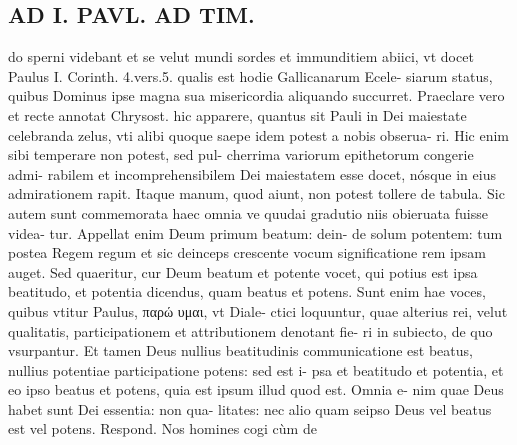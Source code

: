 \documentclass{article}
\begin{document}
\begin{pages}
\section*{AD I. PAVL. AD TIM. }
\marginpar{[ p.300 ]}\pstart do sperni videbant et se velut mundi sordes et immunditiem abiici, vt docet Paulus I. Corinth. 4.vers.5. qualis est hodie Gallicanarum Ecele- siarum status, quibus Dominus ipse magna sua misericordia aliquando succurret. Praeclare vero et recte annotat Chrysost. hic apparere, quantus sit Pauli in Dei maiestate celebranda zelus, vti alibi quoque saepe idem potest a nobis obserua- ri. Hic enim sibi temperare non potest, sed pul- cherrima variorum epithetorum congerie admi- rabilem et incomprehensibilem Dei maiestatem esse docet, nósque in eius admirationem rapit. Itaque manum, quod aiunt, non potest tollere de tabula. Sic autem sunt commemorata haec omnia ve quudai gradutio niis obieruata fuisse videa- tur. Appellat enim Deum primum beatum: dein- de solum potentem: tum postea Regem regum et sic deinceps crescente vocum significatione rem ipsam auget.  \pend\pstart Sed quaeritur, cur Deum beatum et potente vocet, qui potius est ipsa beatitudo, et potentia dicendus, quam beatus et potens. Sunt enim hae voces, quibus vtitur Paulus, παρώ υμαι, vt Diale- ctici loquuntur, quae alterius rei, velut qualitatis, participationem et attributionem denotant fie- ri in subiecto, de quo vsurpantur. Et tamen Deus nullius beatitudinis communicatione est beatus, nullius potentiae participatione potens: sed est i- psa et beatitudo et potentia, et eo ipso beatus et potens, quia est ipsum illud quod est. Omnia e- nim quae Deus habet sunt Dei essentia: non qua- litates: nec alio quam seipso Deus vel beatus est vel potens. Respond. Nos homines cogi cùm de  \pend

\end{pages}
\end{document}
